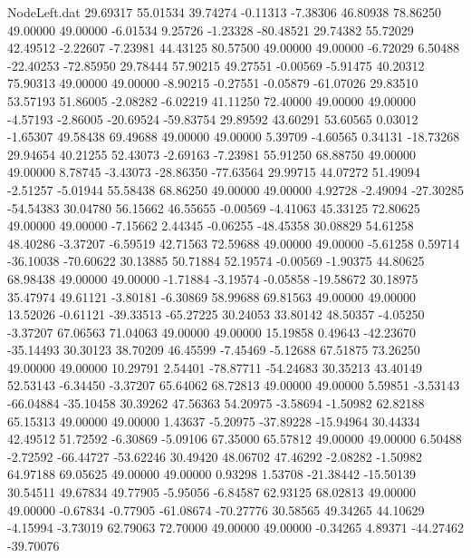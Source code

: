 \begin{filecontents}{NodeLeft.dat}
  29.69317   55.01534   39.74274    -0.11313   -7.38306   46.80938   78.86250   49.00000   49.00000   -6.01534    9.25726   -1.23328  -80.48521
  29.74382   55.72029   42.49512    -2.22607   -7.23981   44.43125   80.57500   49.00000   49.00000   -6.72029    6.50488  -22.40253  -72.85950
  29.78444   57.90215   49.27551    -0.00569   -5.91475   40.20312   75.90313   49.00000   49.00000   -8.90215   -0.27551   -0.05879  -61.07026
  29.83510   53.57193   51.86005    -2.08282   -6.02219   41.11250   72.40000   49.00000   49.00000   -4.57193   -2.86005  -20.69524  -59.83754
  29.89592   43.60291   53.60565     0.03012   -1.65307   49.58438   69.49688   49.00000   49.00000    5.39709   -4.60565    0.34131  -18.73268
  29.94654   40.21255   52.43073    -2.69163   -7.23981   55.91250   68.88750   49.00000   49.00000    8.78745   -3.43073  -28.86350  -77.63564
  29.99715   44.07272   51.49094    -2.51257   -5.01944   55.58438   68.86250   49.00000   49.00000    4.92728   -2.49094  -27.30285  -54.54383
  30.04780   56.15662   46.55655    -0.00569   -4.41063   45.33125   72.80625   49.00000   49.00000   -7.15662    2.44345   -0.06255  -48.45358
  30.08829   54.61258   48.40286    -3.37207   -6.59519   42.71563   72.59688   49.00000   49.00000   -5.61258    0.59714  -36.10038  -70.60622
  30.13885   50.71884   52.19574    -0.00569   -1.90375   44.80625   68.98438   49.00000   49.00000   -1.71884   -3.19574   -0.05858  -19.58672
  30.18975   35.47974   49.61121    -3.80181   -6.30869   58.99688   69.81563   49.00000   49.00000   13.52026   -0.61121  -39.33513  -65.27225
  30.24053   33.80142   48.50357    -4.05250   -3.37207   67.06563   71.04063   49.00000   49.00000   15.19858    0.49643  -42.23670  -35.14493
  30.30123   38.70209   46.45599    -7.45469   -5.12688   67.51875   73.26250   49.00000   49.00000   10.29791    2.54401  -78.87711  -54.24683
  30.35213   43.40149   52.53143    -6.34450   -3.37207   65.64062   68.72813   49.00000   49.00000    5.59851   -3.53143  -66.04884  -35.10458
  30.39262   47.56363   54.20975    -3.58694   -1.50982   62.82188   65.15313   49.00000   49.00000    1.43637   -5.20975  -37.89228  -15.94964
  30.44334   42.49512   51.72592    -6.30869   -5.09106   67.35000   65.57812   49.00000   49.00000    6.50488   -2.72592  -66.44727  -53.62246
  30.49420   48.06702   47.46292    -2.08282   -1.50982   64.97188   69.05625   49.00000   49.00000    0.93298    1.53708  -21.38442  -15.50139
  30.54511   49.67834   49.77905    -5.95056   -6.84587   62.93125   68.02813   49.00000   49.00000   -0.67834   -0.77905  -61.08674  -70.27776
  30.58565   49.34265   44.10629    -4.15994   -3.73019   62.79063   72.70000   49.00000   49.00000   -0.34265    4.89371  -44.27462  -39.70076

\end{filecontents}

